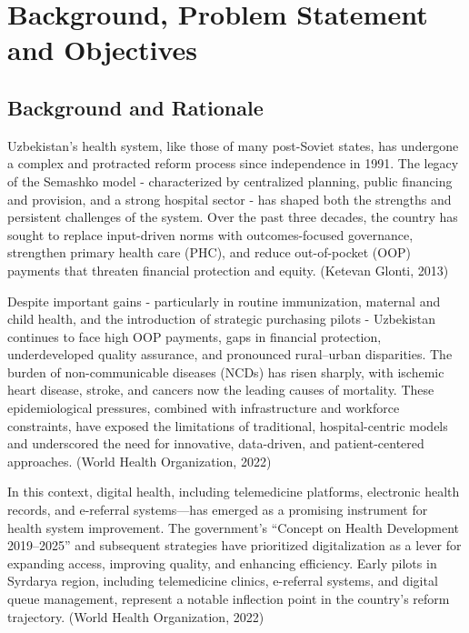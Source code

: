 \chapter{Background, Problem Statement and Objectives}

\section{Background and Rationale}\label{background-and-rationale}

Uzbekistan's health system, like those of many post-Soviet states, has
undergone a complex and protracted reform process since independence in
1991. The legacy of the Semashko model - characterized by centralized
planning, public financing and provision, and a strong hospital sector -
has shaped both the strengths and persistent challenges of the system.
Over the past three decades, the country has sought to replace
input-driven norms with outcomes-focused governance, strengthen primary
health care (PHC), and reduce out-of-pocket (OOP) payments that threaten
financial protection and equity. (Ketevan Glonti, 2013)

Despite important gains - particularly in routine immunization, maternal
and child health, and the introduction of strategic purchasing pilots -
Uzbekistan continues to face high OOP payments, gaps in financial
protection, underdeveloped quality assurance, and pronounced
rural--urban disparities. The burden of non-communicable diseases (NCDs)
has risen sharply, with ischemic heart disease, stroke, and cancers now
the leading causes of mortality. These epidemiological pressures,
combined with infrastructure and workforce constraints, have exposed the
limitations of traditional, hospital-centric models and underscored the
need for innovative, data-driven, and patient-centered approaches.
(World Health Organization, 2022)

In this context, digital health, including telemedicine platforms,
electronic health records, and e-referral systems---has emerged as a
promising instrument for health system improvement. The government's
``Concept on Health Development 2019--2025'' and subsequent strategies
have prioritized digitalization as a lever for expanding access,
improving quality, and enhancing efficiency. Early pilots in Syrdarya
region, including telemedicine clinics, e-referral systems, and digital
queue management, represent a notable inflection point in the country's
reform trajectory. (World Health Organization, 2022)

